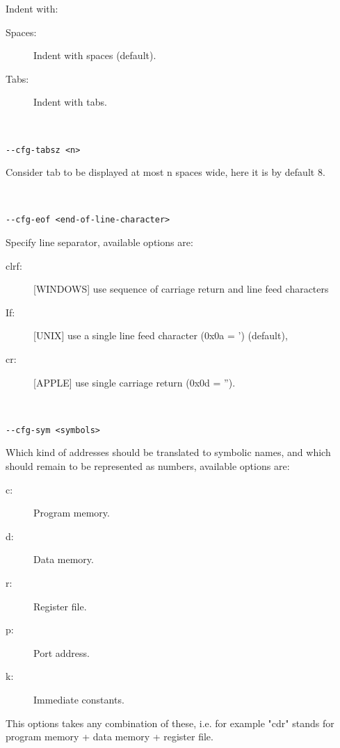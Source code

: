                 Indent with:
                \begin{description}
                  \item [Spaces:] Indent with spaces (default).
                  \item [Tabs:] Indent with tabs.
                \end{description}
                {
                ~\\
                \usecodefont

                \verb'--cfg-tabsz <n>'\\
                }
                Consider tab to be displayed at most n spaces wide, here it is by default 8.
                {
                ~\\
                \usecodefont

                \verb'--cfg-eof <end-of-line-character>'\\
                }
                Specify line separator, available options are:
                \begin{description}
                  \item [clrf:] [WINDOWS] use sequence of carriage return and line feed characters
                  \item [If:] [UNIX] use a single line feed character (0x0a = ') (default),
                  \item [cr:] [APPLE] use single carriage return (0x0d = '').
                \end{description}
                {
                ~\\
                \usecodefont

                \verb'--cfg-sym <symbols>'\\
                }
                Which kind of addresses should be translated to symbolic names, and which should remain to be represented as numbers, available options are:
                \begin{description}
                    \item [c:] Program memory.
                    \item [d:] Data memory.
                    \item [r:] Register file.
                    \item [p:] Port address.
                    \item [k:] Immediate constants.
                \end{description}
                 This options takes any combination of these, i.e. for example "cdr" stands for program memory + data memory + register file.
